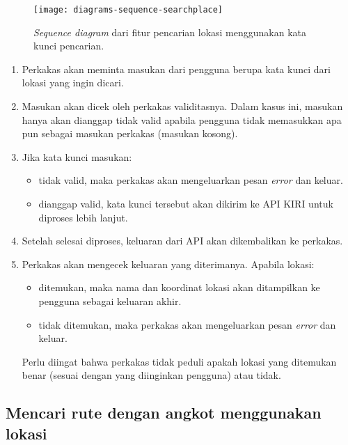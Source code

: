 \begin{figure}[h]
    \centering
    \texttt{[image: diagrams-sequence-searchplace]}
    \caption[\textit{Sequence diagram} fitur pencarian lokasi menggunakan kata kunci lokasi]{\textit{Sequence diagram} dari fitur pencarian lokasi menggunakan kata kunci pencarian.}
    \label{fig:diagrams-sequence-searchplace}
\end{figure}

\begin{enumerate}
	\item Perkakas akan meminta masukan dari pengguna berupa kata kunci dari lokasi yang ingin dicari.
	\item Masukan akan dicek oleh perkakas validitasnya. Dalam kasus ini, masukan hanya akan dianggap tidak valid apabila pengguna tidak memasukkan apa pun sebagai masukan perkakas (masukan kosong).
	\item Jika kata kunci masukan:

	\begin{itemize}
		\item tidak valid, maka perkakas akan mengeluarkan pesan \textit{error} dan keluar.
		\item dianggap valid, kata kunci tersebut akan dikirim ke API KIRI untuk diproses lebih lanjut.
	\end{itemize}
	
	\item Setelah selesai diproses, keluaran dari API akan dikembalikan ke perkakas.
	\item Perkakas akan mengecek keluaran yang diterimanya. Apabila lokasi:
	
	\begin{itemize}
		\item ditemukan, maka nama dan koordinat \latlon lokasi akan ditampilkan ke pengguna sebagai keluaran akhir.
		\item tidak ditemukan, maka perkakas akan mengeluarkan pesan \textit{error} dan keluar.
	\end{itemize}
	
	Perlu diingat bahwa perkakas tidak peduli apakah lokasi yang ditemukan benar (sesuai dengan yang diinginkan pengguna) atau tidak.
	
\end{enumerate}

\subsection{Mencari rute dengan angkot menggunakan \latlon lokasi}
\label{sec:design-flow-findroute}

